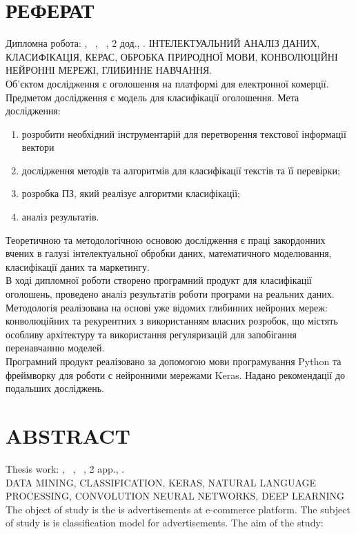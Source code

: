 \chapter*{РЕФЕРАТ}							%

Дипломна робота: , 
~,
~,
2 дод.,
.
ІНТЕЛЕКТУАЛЬНИЙ АНАЛІЗ ДАНИХ, КЛАСИФІКАЦІЯ, КЕРАС,
ОБРОБКА ПРИРОДНОЇ МОВИ, КОНВОЛЮЦІЙНІ НЕЙРОННІ МЕРЕЖІ, ГЛИБИННЕ НАВЧАННЯ.\\
Об’єктом дослідження є оголошення на платформі для електронної комерції. Предметом дослідження є модель для класифікації оголошення.
Мета дослідження:
\begin{enumerate}
	\item розробити необхідний інструментарій для перетворення текстової інформації вектори
	\item дослідження методів та алгоритмів для класифікації текстів та її перевірки;
	\item розробка ПЗ, який реалізує алгоритми класифікації;
    \item аналіз результатів.
\end{enumerate}

Теоретичною та методологічною основою дослідження є праці
закордонних вчених в галузі інтелектуальної обробки даних, математичного
моделювання, класифікації даних та маркетингу. \\
В ході дипломної роботи створено програмний продукт для класифікації оголошень, проведено аналіз результатів роботи програми на реальних даних. \\
Методологія реалізована на основі уже відомих глибинних нейроних мереж: конволюційних та рекурентних з використанням власних розробок, що містять особливу архітектуру та використання регуляризацій для запобігання перенавчанню моделей.\\
Програмний продукт реалізовано за допомогою мови програмування
Python та фреймворку для роботи с нейронними мережами Keras. Надано
рекомендації до подальших досліджень. \\


\chapter*{ABSTRACT}						


Thesis work: , 
~,
~,
2 app.,
.\\
DATA MINING, CLASSIFICATION, KERAS, NATURAL LANGUAGE PROCESSING, CONVOLUTION NEURAL NETWORKS, DEEP LEARNING \\
The object of study is the is advertisements at e-commerce
platform. The subject of study is is classification model for
advertisements.
The aim of the study:

